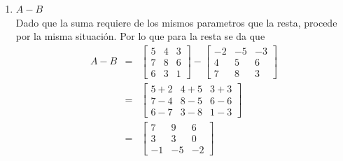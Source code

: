 \documentclass[12pt]{article}
\begin{document}
\begin{enumerate}
\begin{enumerate}
\begin{enumerate}
			\item $A-B$ \\ Dado que la suma requiere de los mismos parametros que la resta, procede por la misma situaci\'on. Por lo que para la resta se da que
				\begin{eqnarray*}
					A - B &=& 	\begin{bmatrix}
									5 & 4 & 3 \\
									7 & 8 & 6 \\
									6 & 3 & 1
								\end{bmatrix} - \begin{bmatrix}
									-2&-5 &-3 \\
									4 & 5 & 6 \\
									7 & 8 & 3
								\end{bmatrix} \\
					&=& \begin{bmatrix}
					 		5+2 & 4+5 & 3+3 \\
							7-4 & 8-5 & 6-6 \\
							6-7 & 3-8 & 1-3
						\end{bmatrix} \\
					&=& \begin{bmatrix}
							7 & 9 & 6 \\
							3 & 3 & 0 \\
							-1&-5 &-2
						\end{bmatrix}
				\end{eqnarray*}
			

\end{enumerate}
\end{enumerate}
\end{enumerate}
\end{document}
